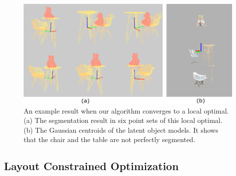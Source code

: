 \begin{figure}
	\centering
	\includegraphics[width=\linewidth]{images/localoptimal/localoptimal}
	\caption{\label{fig:localoptimal} An example result when our algorithm converges to a local optimal. (a) The segmentation result in six point sets of this local optimal. (b) The Gaussian centroids of the latent object models. It shows that the chair and the table are not perfectly segmented.}
\end{figure}

\subsection{Layout Constrained Optimization}
\label{subsec:optimzation}

